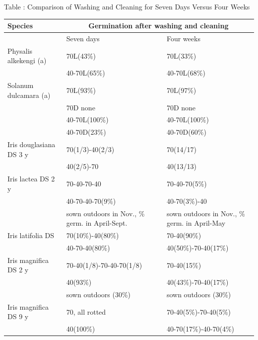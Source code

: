 \begin{table}[h!]
\begin{center}
Table \thetable: Comparison of Washing and Cleaning for Seven Days Versus Four Weeks
\end{center}

\begin{tabular}{|l|p{4cm}|p{4cm}|}
\hline
Species                & \multicolumn{2}{|c|}{Germination after washing and cleaning} \\
\hline
                       & Seven days   & Four weeks    \\
\hline
Physalis alkekengi (a) & 70L(43\%)    & 70L(33\%)     \\
                       & 40-70L(65\%) & 40-70L(68\%)  \\
Solanum dulcamara (a)  & 70L(93\%)    & 70L(97\%)     \\
                       & 70D none     & 70D none      \\
                       & 40-70L(100\%) & 40-70L(100\%)         \\
                       & 40-70D(23\%)  & 40-70D(60\%)          \\
Iris douglasiana DS 3 y& 70(1/3)-40(2/3) & 70(14/17)           \\
                       & 40(2/5)-70    & 40(13/13)             \\
Iris lactea DS 2 y     & 70-40-70-40   & 70-40-70(5\%)         \\
                       & 40-70-40-70(9\%) & 40-70(3\%)-40      \\
            & sown outdoors in Nov., \newline 60\% germ. in April-Sept. & sown outdoors in Nov., \newline  89\% germ. in April-May \\
Iris latifolia DS      & 70(10\%)-40(80\%) & 70-40(90\%)      \\
                       & 40-70-40(80\%)   & 40(50\%)-70-40(17\%)      \\
Iris magnifica DS 2 y  & 70-40(1/8)-70-40-70(1/8) & 70-40(15\%)      \\
                       & 40(93\%)         & 40(43\%)-70-40(17\%)      \\
                       & sown outdoors (30\%) & sown outdoors (30\%)      \\
Iris magnifica DS 9 y  & 70, all rotted   & 70-40(5\%)-70-40(5\%)      \\
                       & 40(100\%)     & 40-70(17\%)-40-70(4\%)      \\

\end{tabular}
\end{table}
